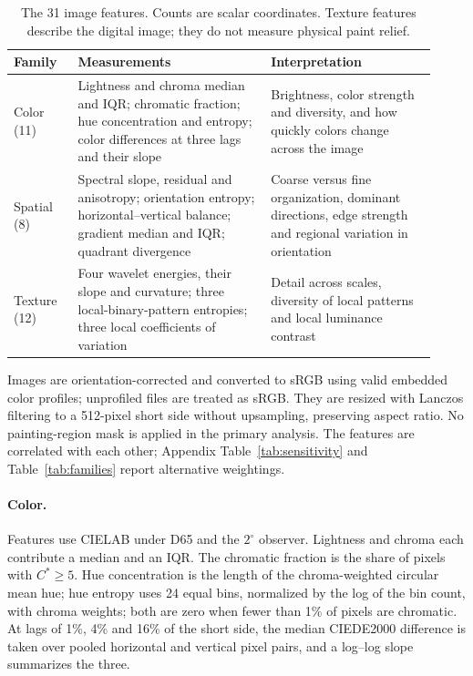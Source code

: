 \begin{table}[ht]
\caption{The 31 image features. Counts are scalar coordinates. Texture features describe the
digital image; they do not measure physical paint relief.}
\label{tab:features}
\vspace{2pt}
\centering\small
\begin{tabular}{@{}p{0.14\linewidth}p{0.42\linewidth}p{0.36\linewidth}@{}}
\toprule
Family & Measurements & Interpretation\\
\midrule
Color (11) & Lightness and chroma median and IQR; chromatic fraction; hue concentration and
entropy; color differences at three lags and their slope & Brightness, color strength and
diversity, and how quickly colors change across the image\\[3pt]
Spatial (8) & Spectral slope, residual and anisotropy; orientation entropy;
horizontal--vertical balance; gradient median and IQR; quadrant divergence & Coarse versus fine
organization, dominant directions, edge strength and regional variation in orientation\\[3pt]
Texture (12) & Four wavelet energies, their slope and curvature; three local-binary-pattern
entropies; three local coefficients of variation & Detail across scales, diversity of local
patterns and local luminance contrast\\
\bottomrule
\end{tabular}
\end{table}

Images are orientation-corrected and converted to sRGB using valid embedded color profiles;
unprofiled files are treated as sRGB. They are resized with Lanczos filtering to a 512-pixel
short side without upsampling, preserving aspect ratio. No painting-region mask is applied in
the primary analysis. The features are correlated with each other; Appendix
Table~\ref{tab:sensitivity} and Table~\ref{tab:families} report alternative weightings.

\paragraph{Color.} Features use CIELAB under D65 and the $2^\circ$ observer. Lightness and
chroma each contribute a median and an IQR. The chromatic fraction is the share of pixels with
$C^*\ge5$. Hue concentration is the length of the chroma-weighted circular mean hue; hue
entropy uses 24 equal bins, normalized by the log of the bin count, with chroma weights; both
are zero when fewer than 1\% of pixels are chromatic. At lags of 1\%, 4\% and 16\% of the short
side, the median CIEDE2000 difference \citep{sharma2005ciede} is taken over pooled horizontal
and vertical pixel pairs, and a log--log slope summarizes the three.

